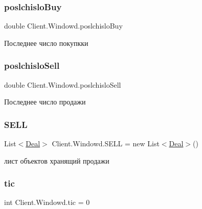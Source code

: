 \subsubsection{\texorpdfstring{poslchislo\+Buy}{poslchisloBuy}}
{\footnotesize\ttfamily double Client.\+Windowd.\+poslchislo\+Buy}



Последнее число покупкки 

\hypertarget{class_client_1_1_windowd_a0f5b6aebf0f3c23cd708480bfc87d1bb}{}\label{class_client_1_1_windowd_a0f5b6aebf0f3c23cd708480bfc87d1bb} 
\subsubsection{\texorpdfstring{poslchislo\+Sell}{poslchisloSell}}
{\footnotesize\ttfamily double Client.\+Windowd.\+poslchislo\+Sell}



Последнее число продажи 

\hypertarget{class_client_1_1_windowd_a1616dcfb8b780f2ff45f74a76cb7d997}{}\label{class_client_1_1_windowd_a1616dcfb8b780f2ff45f74a76cb7d997} 
\subsubsection{\texorpdfstring{S\+E\+LL}{SELL}}
{\footnotesize\ttfamily List$<$\hyperlink{class_client_1_1_deal}{Deal}$>$ Client.\+Windowd.\+S\+E\+LL = new List$<$\hyperlink{class_client_1_1_deal}{Deal}$>$()}



лист объектов хранящий продажи 

\hypertarget{class_client_1_1_windowd_af0c658d1138b70eeafdbc105ec2d7a81}{}\label{class_client_1_1_windowd_af0c658d1138b70eeafdbc105ec2d7a81} 
\subsubsection{\texorpdfstring{tic}{tic}}
{\footnotesize\ttfamily int Client.\+Windowd.\+tic = 0}



